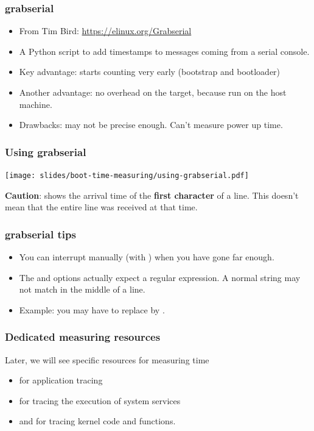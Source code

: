 \begin{frame}
\frametitle{grabserial}
\begin{itemize}
\item From Tim Bird: \url{https://elinux.org/Grabserial}
\item A Python script to add timestamps to messages coming from a
	serial console.
\item Key advantage: starts counting very early (bootstrap and bootloader)
\item Another advantage: no overhead on the target, because run on the host machine.
\item Drawbacks: may not be precise enough. Can't measure power up time.
\end{itemize}
\end{frame}

\begin{frame}
\frametitle{Using grabserial}
\begin{center}
    \texttt{[image: slides/boot-time-measuring/using-grabserial.pdf]}
\end{center}
{\small
{\bf Caution}:  shows the arrival time of the
{\bf first character} of a line. This doesn't mean that the entire line
was received at that time.}
\end{frame}

\begin{frame}
\frametitle{grabserial tips}
\begin{itemize}
  \item You can interrupt  manually (with
  \code{[Ctrl][c]}) when you have gone far enough.
  \item The  and  options actually expect a regular expression.
  A normal string may not match in the middle of a line.
  \item Example: you may have to replace  by
  . 
\end{itemize}
\end{frame}

\begin{frame}
\frametitle{Dedicated measuring resources}
Later, we will see specific resources for measuring time
\begin{itemize}
  \item {} for application tracing
  \item {} for tracing the execution of system services
  \item {} and  for
        tracing kernel code and functions.
\end{itemize}
\end{frame}



